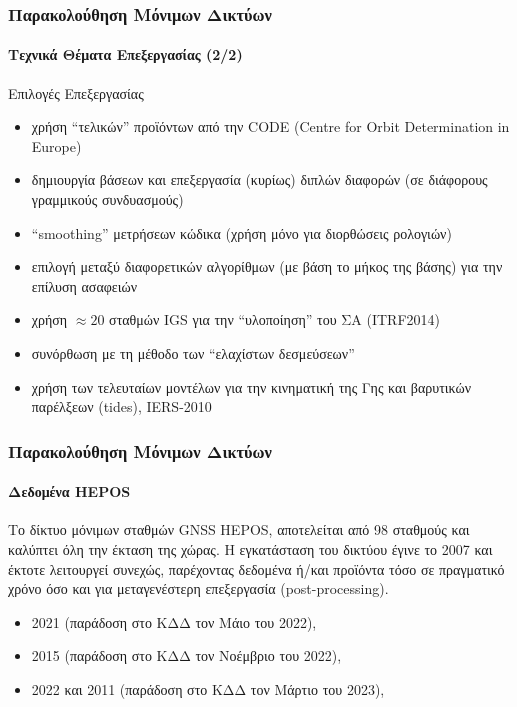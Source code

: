 \begin{frame}
  \frametitle{Παρακολούθηση Μόνιμων Δικτύων}
  \framesubtitle{Τεχνικά Θέματα Επεξεργασίας (2/2)}
  \label{}

    Επιλογές Επεξεργασίας
    \begin{itemize}
        \item χρήση ``τελικών'' προϊόντων από την CODE (Centre for Orbit Determination in Europe) 
        \item δημιουργία βάσεων και επεξεργασία (κυρίως) διπλών διαφορών (σε διάφορους γραμμικούς συνδυασμούς)
        \item ``smoothing'' μετρήσεων κώδικα (χρήση μόνο για διορθώσεις ρολογιών)
        \item επιλογή μεταξύ διαφορετικών αλγορίθμων (με βάση το μήκος της βάσης) για την επίλυση ασαφειών
        \item χρήση $\approx 20$ σταθμών IGS για την ``υλοποίηση'' του ΣΑ (ITRF2014)
        \item συνόρθωση με τη μέθοδο των ``ελαχίστων δεσμεύσεων''
        \item χρήση των τελευταίων μοντέλων για την κινηματική της Γης και βαρυτικών παρέλξεων (tides), IERS-2010
    \end{itemize}
\end{frame}
\note{}

\begin{frame}
  \frametitle{Παρακολούθηση Μόνιμων Δικτύων}
  \framesubtitle{Δεδομένα HEPOS}
  \label{}

    Το δίκτυο μόνιμων σταθμών GNSS HEPOS, αποτελείται από 98 σταθμούς και καλύπτει όλη την
    έκταση της χώρας. Η εγκατάσταση του δικτύου έγινε το 2007 και έκτοτε λειτουργεί
    συνεχώς, παρέχοντας δεδομένα ή/και προϊόντα τόσο σε πραγματικό χρόνο όσο και για
    μεταγενέστερη επεξεργασία (post-processing).
    \vspace{0.3cm}

    \begin{itemize}
        \item 2021 (παράδοση στο ΚΔΔ τον Μάιο του 2022),
        \item 2015 (παράδοση στο ΚΔΔ τον Νοέμβριο του 2022),
        \item 2022 και 2011 (παράδοση στο ΚΔΔ τον Μάρτιο του 2023),
    \end{itemize}
\end{frame}
\note{}

